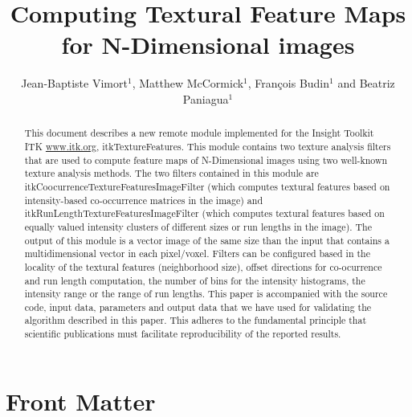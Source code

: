 \documentclass{InsightArticle}
\title{Computing Textural Feature Maps for N-Dimensional images}
\author{Jean-Baptiste Vimort$^{1}$, Matthew McCormick$^{1}$, François Budin$^{1}$ and Beatriz Paniagua$^{1}$}
\newcommand{\IJhandlerIDnumber}{3574}
\begin{document}
%
%
\IJhandlefooter{\IJhandlerIDnumber}


\ifpdf
\else
\fi


\maketitle


\ifhtml
\chapter*{Front Matter\label{front}}
\fi


\begin{abstract}
\noindent
This document describes a new remote module implemented for the Insight Toolkit ITK
  \url{www.itk.org}, itkTextureFeatures. This module contains two texture analysis filters that are used to compute feature maps of N-Dimensional images using two well-known texture analysis methods. The two filters contained in this module are itkCoocurrenceTextureFeaturesImageFilter (which computes textural features based on intensity-based co-occurrence matrices in the image) and itkRunLengthTextureFeaturesImageFilter (which computes textural features based on equally valued intensity clusters of different sizes or run lengths in the image). The output of this module is a vector image of the same size than the input that contains a multidimensional vector in each pixel/voxel. Filters can be configured based in the locality of the textural features (neighborhood size), offset directions for co-ocurrence and run length computation, the number of bins for the intensity histograms, the intensity range or the range of run lengths. This paper is accompanied with the source code, input data, parameters and output data that we have used for validating the algorithm described in this paper. This adheres to the fundamental principle that scientific publications must facilitate reproducibility of the reported results.

\end{abstract}
\end{document}
